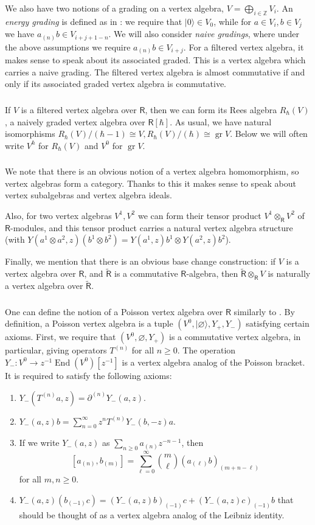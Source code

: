 \documentclass{amsart}
\theoremstyle{definition}
\newcommand{\sss}{\subsubsection{}}
\newcommand{\Ring}{\mathsf{R}}
\newcommand{\gr}{\operatorname{gr}}
\newcommand{\Z}{\mathbb{Z}}
\numberwithin{equation}{section}
\begin{document}
\sss
We also have two  notions of a grading on a vertex algebra, $V=\bigoplus_{i\in \Z}V_i$.  An {\it energy grading} is defined as in  \cite[Section 2.2.2]{Frenkel_loop}: we require that $|0\rangle\in V_0$, while for $a\in V_i, b\in V_j$ we have $a_{(n)}b\in V_{i+j+1-n}$. We will also consider {\it naive gradings}, where under the above assumptions we require $a_{(n)}b\in V_{i+j}$. 
For a filtered vertex algebra, it makes sense to speak about its associated graded. This is a vertex algebra which carries a naive grading. The filtered vertex algebra is almost commutative if and only if its associated graded vertex algebra is commutative.

\sss If $V$ is a filtered vertex algebra over $\Ring$, then we can form its Rees algebra $R_\hbar(V)$, a naively graded vertex algebra over $\Ring[\hbar]$. As usual, we have natural isomorphisms
$R_\hbar(V)/(\hbar-1)\cong V, R_\hbar(V)/(\hbar)\cong \gr V$. Below we will often write $V^\hbar$ for $R_\hbar(V)$ and $V^0$ for $\gr V$.

\sss
We note that there is an obvious notion of a vertex algebra homomorphism, so vertex algebras form a category. Thanks to this it makes sense to speak about vertex subalgebras and vertex algebra ideals. 

Also, for two vertex algebras $V^1,V^2$ we can form their tensor product $V^1 \otimes_{\Ring} V^2$ of $\Ring$-modules, and this tensor product carries a natural vertex algebra structure (with $Y(a^1\otimes a^2, z)(b^1\otimes b^2)=Y(a^1,z)b^1\otimes Y(a^2,z)b^2$). 

Finally, we mention that there is an obvious base change construction: if $V$ is a vertex algebra over $\Ring$, and $\tilde{\Ring}$ is a commutative $\Ring$-algebra, then $\tilde{\Ring}\otimes_{\Ring}V$ is naturally a vertex algebra over $\tilde{\Ring}$.

\sss\label{SSS_Poisson_vertex}
One can define the notion of a Poisson vertex algebra over $\Ring$ similarly to \cite[Section 3.3]{ATV}. By definition, a Poisson vertex algebra is a tuple $(V^0,|\varnothing\rangle, Y_+,Y_-)$ satisfying certain axioms. First, we require that $(V^0,\varnothing,Y_+)$ is a commutative vertex algebra, in particular, giving operators $T^{(n)}$
for all $n\geqslant 0$. The operation $Y_-: V^0\rightarrow z^{-1}\operatorname{End}(V^0)[z^{-1}]$ is a vertex algebra analog of the Poisson bracket. It is required to satisfy the following axioms:
\begin{enumerate}
\item $Y_-(T^{(n)}a,z)=\partial^{(n)}Y_-(a,z)$.
\item $Y_-(a,z)b=\sum_{n=0}^\infty z^n T^{(n)}Y_-(b,-z)a$.
\item If we write $Y_-(a,z)$ as $\sum_{n\geqslant 0}a_{(n)}z^{-n-1}$, then $$[a_{(n)},b_{(m)}]=\sum_{\ell=0}^\infty {m\choose \ell}(a_{(\ell)}b)_{(m+n-\ell)}$$ for all $m,n\geqslant 0$.
\item $Y_-(a,z)(b_{(-1)}c)=(Y_-(a,z)b)_{(-1)}c+(Y_-(a,z)c)_{(-1)}b$ that should be thought of as a vertex algebra analog of the Leibniz identity.
\end{enumerate}
\end{document}
